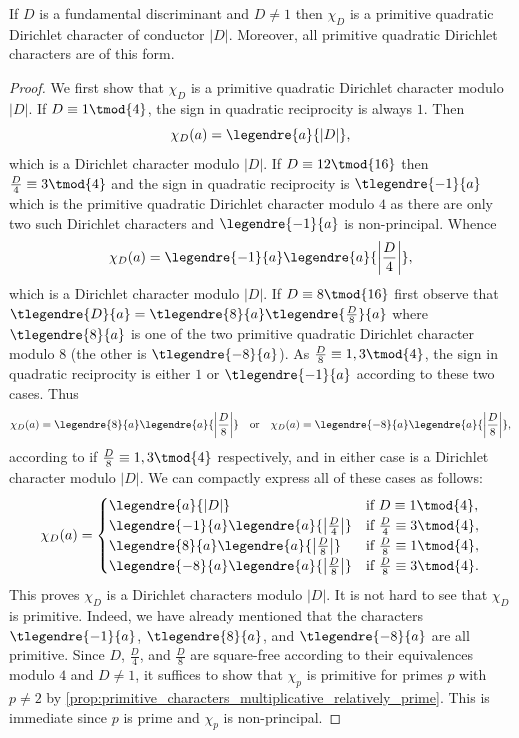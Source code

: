 \documentclass[12pt]{article}
\begin{document}
      \begin{theorem}\label{thm:fundamental_discriminant_character_primitive}
        If \(D\) is a fundamental discriminant and \(D \neq 1\) then \(\chi_{D}\) is a primitive quadratic Dirichlet character of conductor \(|D|\). Moreover, all primitive quadratic Dirichlet characters are of this form.
      \end{theorem}
      \begin{proof}
        We first show that \(\chi_{D}\) is a primitive quadratic Dirichlet character modulo \(|D|\). If \(D \equiv 1 \tmod{4}\), the sign in quadratic reciprocity is always \(1\). Then
        \[
          \chi_{D}(a) = \legendre{a}{|D|},
        \]
        which is a Dirichlet character modulo \(|D|\). If \(D \equiv 12 \tmod{16}\) then \(\frac{D}{4} \equiv 3 \tmod{4}\) and the sign in quadratic reciprocity is \(\tlegendre{-1}{a}\) which is the primitive quadratic Dirichlet character modulo \(4\) as there are only two such Dirichlet characters and \(\legendre{-1}{a}\) is non-principal. Whence
        \[
          \chi_{D}(a) = \legendre{-1}{a}\legendre{a}{\left|\frac{D}{4}\right|},
        \]
        which is a Dirichlet character modulo \(|D|\). If \(D \equiv 8 \tmod{16}\) first observe that \(\tlegendre{D}{a} = \tlegendre{8}{a}\tlegendre{\frac{D}{8}}{a}\) where \(\tlegendre{8}{a}\) is one of the two primitive quadratic Dirichlet character modulo \(8\) (the other is \(\tlegendre{-8}{a}\)). As \(\frac{D}{8} \equiv 1,3 \tmod{4}\), the sign in quadratic reciprocity is either \(1\) or \(\tlegendre{-1}{a}\) according to these two cases. Thus
        \[
          \chi_{D}(a) = \legendre{8}{a}\legendre{a}{\left|\frac{D}{8}\right|} \quad \text{or} \quad \chi_{D}(a) = \legendre{-8}{a}\legendre{a}{\left|\frac{D}{8}\right|},
        \]
        according to if \(\frac{D}{8} \equiv 1,3 \tmod{4}\) respectively, and in either case is a Dirichlet character modulo \(|D|\). We can compactly express all of these cases as follows:
        \[
          \chi_{D}(a) = \begin{cases} \legendre{a}{|D|} & \text{if \(D \equiv 1 \tmod{4}\)}, \\ \legendre{-1}{a}\legendre{a}{\left|\frac{D}{4}\right|} & \text{if \(\frac{D}{4} \equiv 3 \tmod{4}\)}, \\ \legendre{8}{a}\legendre{a}{\left|\frac{D}{8}\right|} & \text{if \(\frac{D}{8} \equiv 1 \tmod{4}\)}, \\ \legendre{-8}{a}\legendre{a}{\left|\frac{D}{8}\right|} & \text{if \(\frac{D}{8} \equiv 3 \tmod{4}\)}. \end{cases}
        \]
        This proves \(\chi_{D}\) is a Dirichlet characters modulo \(|D|\). It is not hard to see that \(\chi_{D}\) is primitive. Indeed, we have already mentioned that the characters \(\tlegendre{-1}{a}\), \(\tlegendre{8}{a}\), and \(\tlegendre{-8}{a}\) are all primitive. Since \(D\), \(\frac{D}{4}\), and \(\frac{D}{8}\) are square-free according to their equivalences modulo \(4\) and \(D \neq 1\), it suffices to show that \(\chi_{p}\) is primitive for primes \(p\) with \(p \neq 2\) by \cref{prop:primitive_characters_multiplicative_relatively_prime}. This is immediate since \(p\) is prime and \(\chi_{p}\) is non-principal. 
        

\end{proof}
\end{document}
